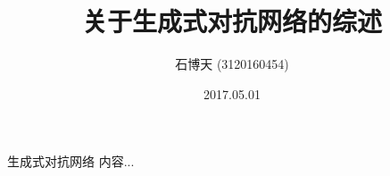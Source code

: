 \documentclass{ctexart}
\begin{document}
	\title{关于生成式对抗网络的综述}
	\author{石博天 (3120160454)}
	\date{2017.05.01}
	
	\maketitle
	\begin{section}{生成式对抗网络}
		内容...
	\end{section}	
\end{document}
